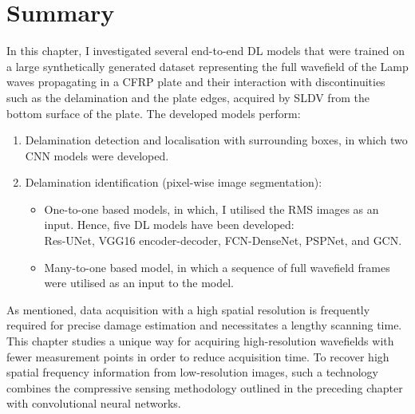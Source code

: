 \section{Summary}
\label{sec55}

In this chapter, I investigated several end-to-end DL models that were trained on a large synthetically generated dataset representing the full wavefield of the Lamp waves propagating in a CFRP plate and their interaction with discontinuities such as the delamination and the plate edges, acquired by SLDV from the bottom surface of the plate. 
The developed models perform: 
\begin{enumerate}
	\item Delamination detection and localisation with surrounding boxes, in which two CNN models were developed.
	\item Delamination identification (pixel-wise image segmentation):
		\begin{itemize}
			\item One-to-one based models, in which, I utilised the RMS images as an input.
			Hence, five DL models have been developed: \\ Res-UNet, VGG16 encoder-decoder, FCN-DenseNet, PSPNet, and GCN.
			\item Many-to-one based model, in which a sequence of full wavefield frames were utilised as an input to the model.
		\end{itemize} 
\end{enumerate}

As mentioned, data acquisition with a high spatial resolution is frequently required for precise damage estimation and necessitates a lengthy scanning time.
This chapter studies a unique way for acquiring high-resolution wavefields with fewer measurement points in order to reduce acquisition time.
To recover high spatial frequency information from low-resolution images, such a technology combines the compressive sensing methodology outlined in the preceding chapter with convolutional neural networks.

